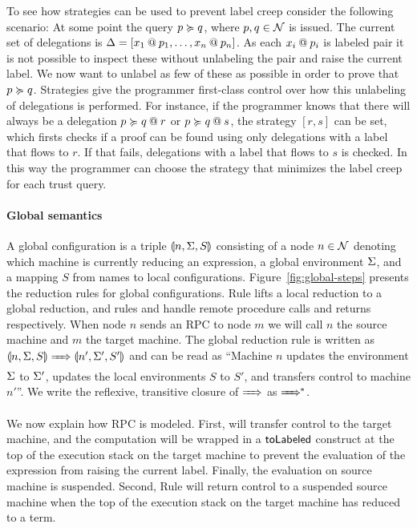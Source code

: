 To see how strategies can be used to prevent label creep consider the following scenario: At some point the query $p \actsfor q$, where $p, q \in \Nameset$ is issued. The current set of delegations is $\scope = \left[ \lb{p_1}{x_1}, \dots, \lb{p_n}{x_n} \right]$. As each $\lb{p_i}{x_i}$ is labeled pair it is not possible to inspect these without unlabeling the pair and raise the current label. We now want to unlabel as few of these as possible in order to prove that $p \actsfor q$. Strategies give the programmer first-class control over how this unlabeling of delegations is performed. For instance, if the programmer knows that there will always be a delegation $\lb{r}{p \actsfor q}$ or $\lb{s}{p \actsfor q}$, the strategy $\left[ r, s \right]$ can be set, which firsts checks if a proof can be found using only delegations with a label that flows to $r$. If that fails, delegations with a label that flows to $s$ is checked. In this way the programmer can choose the strategy that minimizes the label creep for each trust query.

\paragraph{Global semantics}
A global configuration is a triple $\gconfig{n}{\env}{S}$ consisting of a node $n \in \Nameset$ denoting which machine is currently reducing an expression, a global environment $\env$, and a mapping $S$ from names to local configurations. Figure~\ref{fig:global-steps} presents the reduction rules for global configurations. Rule  lifts a local reduction to a global reduction, and rules  and  handle remote procedure calls and returns respectively. When node $n$ sends an RPC to node $m$ we will call $n$ the source machine and $m$ the target machine. The global reduction rule is written as $\gconfig{n}{\env}{S} \gstepsto \gconfig{n'}{\env'}{S'}$ and can be read as ``Machine $n$ updates the environment $\env$ to $\env'$, updates the local environments $S$ to $S'$, and transfers control to machine $n'$''. We write the reflexive, transitive closure of $\gstepsto$ as $\gstepstos$.

We now explain how RPC is modeled. First,  will transfer control to the target machine, and the computation will be wrapped in a $\tolabeledkw$ construct at the top of the execution stack on the target machine to prevent the evaluation of the expression from raising the current label. Finally, the evaluation on source machine is suspended. Second, Rule  will return control to a suspended source machine when the top of the execution stack on the target machine has reduced to a term.

